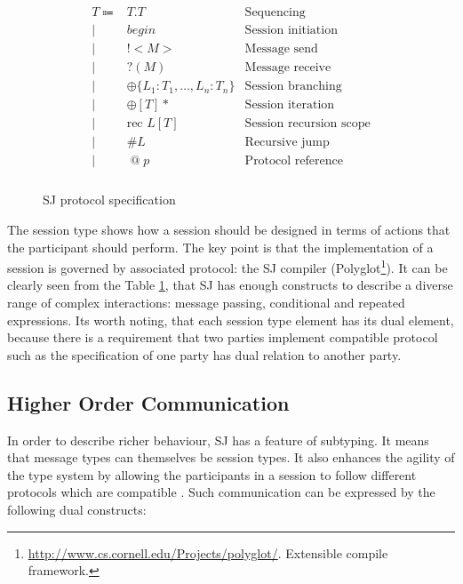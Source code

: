 \documentclass{llncs}
\begin{document}
\begin{figure}
\begin{gather*}
\begin{array}{rlr}
T \Coloneqq & T.T & \mbox{Sequencing} \\ 
       \mid & begin & \mbox{Session initiation} \\
       \mid & !<M> & \mbox{Message send} \\ 
       \mid & ?(M) & \mbox{Message receive} \\
       \mid & \oplus \{L_1:T_1,\dots, L_n:T_n \} & \mbox{Session branching} \\ 
       \mid & \oplus [T]* & \mbox{Session iteration} \\ 
       \mid & \text{rec }L[T] & \mbox{Session recursion scope} \\ 
       \mid & \#L & \mbox{Recursive jump} \\ 
       \mid & \mathopen{@}p & \mbox{Protocol reference} \\
\end{array}
\end{gather*}
\caption{SJ protocol specification}\label{tab:prot-spec} 
\end{figure}

The session type shows how a session should be designed in terms of actions that the participant should perform. The key point is that the implementation of a session is governed by associated protocol: the SJ compiler (Polyglot\footnote{\url{http://www.cs.cornell.edu/Projects/polyglot/}. Extensible compile framework.}). It can be clearly seen from the Table \ref{tab:prot-spec}, that SJ has enough constructs to describe a diverse range of complex interactions: message passing, conditional and repeated expressions. Its worth noting, that each session type element has its dual element, because there is a requirement that two parties implement compatible protocol such as the specification of one party has dual relation to another party.

\subsection{Higher Order Communication}
In order to describe richer behaviour, SJ has a feature of subtyping. It means that message types can themselves be session types. It also enhances the agility of the type system by allowing the participants in a session to follow different protocols which are compatible \cite{higher-order-comm}. Such communication can be expressed by the following dual constructs:
\end{document}
